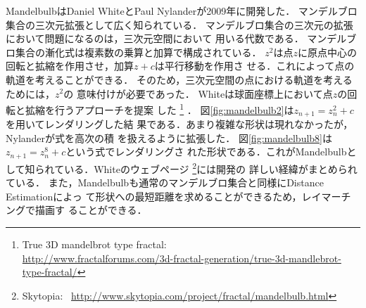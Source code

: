 MandelbulbはDaniel WhiteとPaul Nylanderが2009年に開発した．
マンデルブロ集合の三次元拡張として広く知られている．
マンデルブロ集合の三次元の拡張において問題になるのは，三次元空間において
用いる代数である．
マンデルブロ集合の漸化式は複素数の乗算と加算で構成されている．
$z^2$は点$z$に原点中心の回転と拡縮を作用させ，加算$z + c$は平行移動を作用さ
せる．これによって点の軌道を考えることができる．
そのため，三次元空間の点における軌道を考えるためには，$z^2$の
意味付けが必要であった．
Whiteは球面座標上において点$z$の回転と拡縮を行うアプローチを提案
した
\footnote{True 3D mandelbrot type fractal: \\
\url{http://www.fractalforums.com/3d-fractal-generation/true-3d-mandlebrot-type-fractal/}}
．
図\ref{fig:mandelbulb2}は$z_{n+1} = z_n^2 + c$を用いてレンダリングした結
果である．あまり複雑な形状は現れなかったが，Nylanderが式を高次の積
を扱えるように拡張した．
図\ref{fig:mandelbulb8}は$z_{n+1} = z_n^8 + c $という式でレンダリングさ
れた形状である．これがMandelbulbとして知られている．Whiteのウェブページ
\footnote{Skytopia:
~\url{http://www.skytopia.com/project/fractal/mandelbulb.html}}には開発の
詳しい経緯がまとめられている．
また，Mandelbulbも通常のマンデルブロ集合と同様にDistance Estimationによっ
て形状への最短距離を求めることができるため，レイマーチングで描画す
ることができる．

